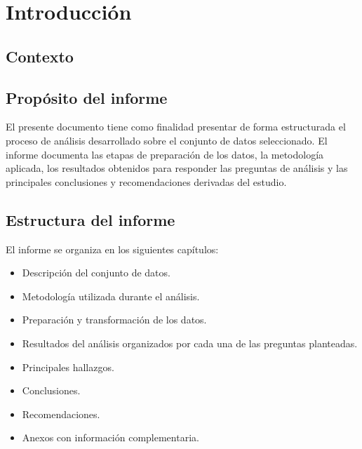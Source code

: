 \chapter{Introducción}

\section{Contexto}



\section{Propósito del informe}

El presente documento tiene como finalidad presentar de forma estructurada el proceso de análisis desarrollado sobre el conjunto de datos seleccionado. El informe documenta las etapas de preparación de los datos, la metodología aplicada, los resultados obtenidos para responder las preguntas de análisis y las principales conclusiones y recomendaciones derivadas del estudio.

\section{Estructura del informe}

El informe se organiza en los siguientes capítulos:

\begin{itemize}

\item Descripción del conjunto de datos.

\item Metodología utilizada durante el análisis.

\item Preparación y transformación de los datos.

\item Resultados del análisis organizados por cada una de las preguntas planteadas.

\item Principales hallazgos.

\item Conclusiones.

\item Recomendaciones.

\item Anexos con información complementaria.

\end{itemize}